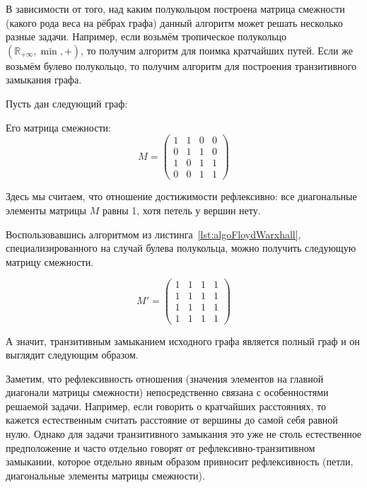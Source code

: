 В зависимости от того, над каким полукольцом построена матрица смежности (какого рода веса на рёбрах графа) данный алгоритм может решать несколько разные задачи. Например, если возьмём тропическое полукольцо $(\mathbb{R}_{+\infty}, \min, +)$, то получим алгоритм для поимка кратчайших путей. Если же возьмём булево полукольцо, то получим алгоритм для построения транзитивного замыкания графа.

\begin{example}
  Пусть дан следующий граф:
  \begin{center}
    
  \end{center}

  Его матрица смежности:
  $$ M = 
  \begin{pmatrix}
    1 & 1 & 0 & 0 \\
    0 & 1 & 1 & 0 \\
    1 & 0 & 1 & 1 \\
    0 & 0 & 1 & 1
  \end{pmatrix}
  $$

  Здесь мы считаем, что отношение достижимости рефлексивно: все диагональные элементы матрицы $M$ равны 1, хотя петель у вершин нету. 

  Воспользовавшись алгоритмом из листинга~\ref{lst:algoFloydWarxhall}, специализированного на случай булева полукольца, можно получить следующую матрицу смежности.

  $$ M' = 
  \begin{pmatrix}
    1 & 1 & 1 & 1 \\
    1 & 1 & 1 & 1 \\
    1 & 1 & 1 & 1 \\
    1 & 1 & 1 & 1
  \end{pmatrix}
  $$

  А значит, транзитивным замыканием исходного графа является полный граф и он выглядит следующим образом.
  
  \begin{center}
    
  \end{center}

\end{example}

Заметим, что рефлексивность отношения (значения элементов на главной диагонали матрицы смежности) непосредственно связана с особенностями решаемой задачи. Например, если говорить о кратчайших расстояниях, то кажется естественным считать расстояние от вершины до самой себя равной нулю. Однако для задачи транзитивного замыкания это уже не столь естественное предположение и часто отдельно говорят от рефлексивно-транзитивном замыкании, которое отдельно явным образом привносит рефлексивность (петли, диагональные элементы матрицы смежности).



